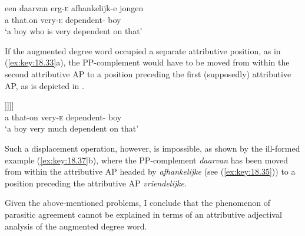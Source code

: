 \documentclass[output=paper]{langsci/langscibook}
\begin{document}
\ea%
    \label{ex:key:18.35}
    \sn
    \gll  een    daarvan  erg-\textsc{e}    afhankelijk-e    jongen\\
         a        that.on      very-\textsc{e}  dependent-\Agr{}    boy\\
    \glt \enquote*{a boy who is very dependent on that}
\z

If the augmented degree word occupied a separate attributive position, as in
(\ref{ex:key:18.33}a), the PP-complement would have to be moved from within the
second attributive AP to a position preceding the first (supposedly)
attributive AP, as is depicted in .

\ea%
    \label{ex:key:18.36}
    \sn
    \gll  [\textsubscript{DP}  een    [daarvan\textsubscript{i}  [\textsubscript{NP}  erg\textbf{\textsc{-e}}  [\textsubscript{NP}  [t\textsubscript{i}    afhankelijk\textbf{e}]  [\textsubscript{NP}  jongen]]]]]\\
      {}  a              that-on   {}         very-\textsc{e}      {}  {}    dependent-\Agr{}   {}   boy\\
    \glt \enquote*{a boy very much dependent on that}
\z

Such a displacement operation, however, is impossible, as shown by the
ill-formed example (\ref{ex:key:18.37}b), where the PP-complement \emph{daarvan} has
been moved from within the attributive AP headed by \emph{afhankelijke} (see
(\ref{ex:key:18.35})) to a position preceding the attributive AP
\emph{vriendelijke}.

\ea%
    \label{ex:key:18.37}
	\z
\z

Given the above-mentioned problems, I conclude that the phenomenon of parasitic
agreement cannot be explained in terms of an attributive adjectival analysis of
the augmented degree word.
\end{document}
